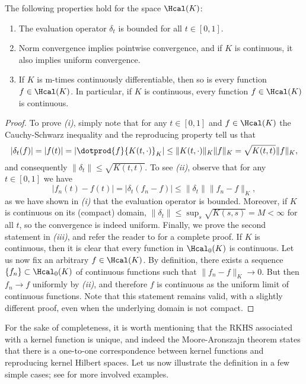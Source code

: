 \begin{proposition} The following properties hold for the space \(\Hcal(K)\):
  \begin{enumerate}
    \item The evaluation operator \(\delta_t\) is bounded for all \(t\in[0,1]\).
    \item Norm convergence implies pointwise convergence, and if \(K\) is continuous, it also implies uniform convergence.
    \item If \(K\) is m-times continuously differentiable, then so is every function \(f\in\Hcal(K)\). In particular, if \(K\) is continuous, every function \(f\in\Hcal(K)\) is continuous.
  \end{enumerate}
\end{proposition}
\begin{proof}
  To prove \textit{(i)}, simply note that for any \(t\in[0,1]\) and \(f\in\Hcal(K)\) the Cauchy-Schwarz inequality and the reproducing property tell us that
  \[
  |\delta_t(f)| = |f(t)| = |\dotprod{f}{K(t, \cdot)}_K| \leq \|K(t, \cdot)\|_K \|f\|_K = \sqrt{K(t, t)}\|f\|_K,
  \]
  and consequently \(\|\delta_t\|\leq \sqrt{K(t, t)}\). To see \textit{(ii)}, observe that for any \(t\in[0,1]\) we have
  \[
    |f_n(t) - f(t)| = |\delta_t(f_n - f)| \leq \|\delta_t\|\|f_n - f\|_K,
  \]
  as we have shown in \textit{(i)} that the evaluation operator is bounded. Moreover, if \(K\) is continuous on its (compact) domain, \(\|\delta_t\| \leq \sup_s \sqrt{K(s, s)}=M<\infty\) for all \(t\), so the convergence is indeed uniform. Finally, we prove the second statement in \textit{(iii)}, and refer the reader to \citet[][Th 2.6]{saitoh2016theory} for a complete proof. If \(K\) is continuous, then it is clear that every function in \(\Hcal_0(K)\) is continuous. Let us now fix an arbitrary \(f\in \Hcal(K)\). By definition, there exists a sequence \(\{f_n\}\subset \Hcal_0(K)\) of continuous functions such that \(\|f_n - f\|_K \to 0\). But then \(f_n \to f\) uniformly by \textit{(ii)}, and therefore \(f\) is continuous as the uniform limit of continuous functions. Note that this statement remains valid, with a slightly different proof, even when the underlying domain is not compact.
\end{proof}

For the sake of completeness, it is worth mentioning that the RKHS associated with a kernel function is unique, and indeed the Moore-Aronszajn theorem \citep[e.g.][Th. 3]{berlinet2004reproducing} states that there is a one-to-one correspondence between kernel functions and reproducing kernel Hilbert spaces. Let us now illustrate the definition in a few simple cases; see \citet[][Ch.~1]{saitoh2016theory} for more involved examples.


